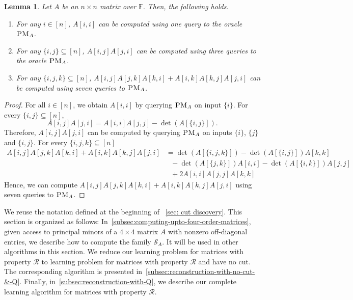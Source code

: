 \documentclass[11pt,letterpaper]{article}
\newcommand{\F}{\mathbb{F}}
\newtheorem{lemma}{Lemma}[section]
\newcommand{\prop}{\mathcal{R}}
\newcommand{\PMoracle}[1]{\textsc{PM}_{#1}}
\newcommand{\fourPMEfamily}[1]{\mathcal{S}_{#1}}
\begin{document}
{{{\begin{lemma}
\label{lem:computation-using-PM-oracle}
Let $A$ be an $n\times n$ matrix over $\F$. Then, the following holds.
\begin{enumerate}
\item For any $i\in[n]$, $A[i,i]$ can be computed using one query to the oracle $\PMoracle{A}$.
\item For any $\{i, j\}\subseteq [n]$, $A[i,j]A[j,i]$ can be computed using three queries to the oracle $\PMoracle{A}$.
\item For any $\{i, j, k\}\subseteq [n]$, $A[i,j]A[j, k]A[k, i]+A[i, k]A[k, j]A[j, i]$ can be computed using seven queries to $\PMoracle{A}$.
\end{enumerate}
\end{lemma}
\begin{proof}
For all $i\in[n]$, we obtain $A[i,i]$ by querying $\PMoracle{A}$ on input $\{i\}$. For every $\{i,j\}\subseteq [n]$, $$A[i,j]A[j,i]=A[i,i]A[j,j]-\det(A[\{i,j\}]).$$ Therefore, $A[i,j]A[j,i]$ can be computed by querying $\PMoracle{A}$ on inputs $\{i\}$, $\{j\}$ and $\{i,j\}$. For every $\{i,j,k\}\subseteq [n]$ 
\begin{align*}
A[i,j]A[j,k]A[k,i]+A[i,k]A[k,j]A[j,i] &= \det(A[\{i,j,k\}])-\det(A[\{i,j\}])A[k,k]  \\
&\ \ \ -\det(A[\{j,k\}])A[i,i]-\det(A[\{i,k\}])A[j,j] \\
&\ \ \ +2A[i,i]A[j,j]A[k,k]
\end{align*}
Hence, we can compute $A[i,j]A[j,k]A[k,i]+A[i,k]A[k,j]A[j,i]$ using seven queries to $\PMoracle{A}$.
\end{proof}

We reuse the notation defined at the beginning of ~\cref{sec: cut discovery}. This section is organized as follows: In~\cref{subsec:computing-upto-four-order-matrices}, given access to principal minors of a $4\times 4$ matrix $A$ with nonzero off-diagonal entries, we describe how to compute the family $\fourPMEfamily{A}$. It will be used in other algorithms in this section. We reduce our learning problem for matrices with property $\prop$ to learning problem for matrices with property $\prop$ and have no cut. The corresponding algorithm is presented in~\cref{subsec:reconstruction-with-no-cut-&-Q}. Finally, in~\cref{subsec:reconstruction-with-Q}, we describe our complete learning algorithm for matrices with property $\prop$.  



}}}
\end{document}
